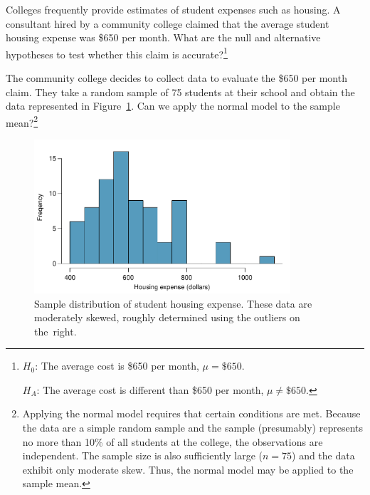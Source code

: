 \begin{exercise} \label{htForHousingExpenseForCommunityCollege650}
Colleges frequently provide estimates of student expenses such as housing. A consultant hired by a community college claimed that the average student housing expense was \$650 per month. What are the null and alternative hypotheses to test whether this claim is accurate?\footnote{$H_0$: The average cost is \$650 per month, $\mu = \$650$.

\hspace{3.4mm}$H_A$: The average cost is different than \$650 per month, $\mu \neq \$650$.}
\end{exercise}

\begin{exercise} \label{normalDistCondForHousingExpenseForCommunityCollege650}
The community college decides to collect data to evaluate the \$650 per month claim. They take a random sample of 75 students at their school and obtain the data represented in Figure~\ref{communityCollegeClaimedHousingExpenseDistribution}. Can we apply the normal model to the sample mean?\footnote{Applying the normal model requires that certain conditions are met. Because the data are a simple random sample and the sample (presumably) represents no more than 10\% of all students at the college, the observations are independent. The sample size is also sufficiently large ($n=75$) and the data exhibit only moderate skew. Thus, the normal model may be applied to the sample mean.}

\begin{figure}
\centering
\includegraphics[width=0.85\textwidth]{04/figures/communityCollegeClaimedHousingExpenseDistribution/communityCollegeClaimedHousingExpenseDistribution}
\caption{Sample distribution of student housing expense. These data are moderately skewed, roughly determined using the outliers on the~right.}
\label{communityCollegeClaimedHousingExpenseDistribution}
\end{figure}
\end{exercise}



